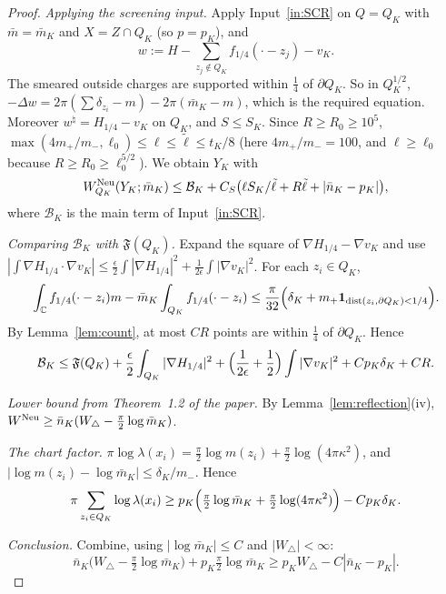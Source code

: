 \documentclass[11pt]{article}
\theoremstyle{definition}
\theoremstyle{remark}
\newcommand{\C}{\mathbb C}
\newcommand{\Wtri}{W_{\triangle}}
\begin{document}
\begin{proof}
\emph{Applying the screening input.} Apply Input~\ref{in:SCR} on $Q=Q_K$ with $\bar m=\bar m_K$
and $X=Z\cap Q_K$ (so $p=p_K$), and
\[
w:=H-\sum_{z_j\notin Q_K}f_{1/4}(\cdot-z_j)-v_K .
\]
The smeared outside charges are supported within $\tfrac14$ of $\partial Q_K$. So in $Q_K^{1/2}$,
$-\Delta w=2\pi(\sum\delta_{z_i}-m)-2\pi(\bar m_K-m)$, which is the required equation. Moreover
$w^\natural=H_{1/4}-v_K$ on $Q_K$, and $S\le S_K$. Since $R\ge R_0\ge10^5$,
$\max(4m_+/m_-,\ell_0)\le\ell\le\tilde\ell\le t_K/8$ (here $4m_+/m_-=100$, and $\ell\ge\ell_0$ because
$R\ge R_0\ge\ell_0^{5/2}$).
We obtain $Y_K$ with
\[
W^{\rm Neu}_{Q_K}(Y_K;\bar m_K)\le\mathcal B_K+C_S\bigl(\ell S_K/\tilde\ell+R\tilde\ell+|\bar n_K-p_K|\bigr),
\]
where $\mathcal B_K$ is the main term of Input~\ref{in:SCR}.

\emph{Comparing $\mathcal B_K$ with $\mathfrak F(Q_K)$.} Expand the square of
$\nabla H_{1/4}-\nabla v_K$ and use
$|\int\nabla H_{1/4}\cdot\nabla v_K|\le\frac\epsilon2\int|\nabla H_{1/4}|^2+\frac1{2\epsilon}\int|\nabla v_K|^2$.
For each $z_i\in Q_K$,
\[
\int_\C f_{1/4}(\cdot-z_i)m-\bar m_K\int_{Q_K}f_{1/4}(\cdot-z_i)\le\frac\pi{32}\Bigl(\delta_K+m_+\mathbf 1_{\operatorname{dist}(z_i,\partial Q_K)<1/4}\Bigr).
\]
By Lemma~\ref{lem:count}, at most $CR$ points are within $\tfrac14$ of $\partial Q_K$. Hence
\[
\mathcal B_K\le\mathfrak F(Q_K)+\frac\epsilon2\int_{Q_K}|\nabla H_{1/4}|^2+\Bigl(\frac1{2\epsilon}+\frac12\Bigr)\int|\nabla v_K|^2+Cp_K\delta_K+CR .
\]

\emph{Lower bound from Theorem~1.2 of the paper.} By Lemma~\ref{lem:reflection}(iv),
$W^{\rm Neu}\ge\bar n_K(\Wtri-\frac\pi2\log\bar m_K)$.

\emph{The chart factor.} $\pi\log\lambda(x_i)=\frac\pi2\log m(z_i)+\frac\pi2\log(4\pi\kappa^2)$, and
$|\log m(z_i)-\log\bar m_K|\le\delta_K/m_-$. Hence
\[
\pi\sum_{z_i\in Q_K}\log\lambda(x_i)\ge p_K\Bigl(\tfrac\pi2\log\bar m_K+\tfrac\pi2\log(4\pi\kappa^2)\Bigr)-Cp_K\delta_K .
\]

\emph{Conclusion.} Combine, using $|\log\bar m_K|\le C$ and $|\Wtri|<\infty$:
\[
\bar n_K\bigl(\Wtri-\tfrac\pi2\log\bar m_K\bigr)+p_K\tfrac\pi2\log\bar m_K\ge p_K\Wtri-C|\bar n_K-p_K| .
\]
\end{proof}
\end{document}
